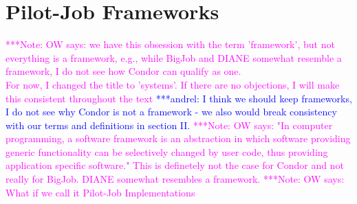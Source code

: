 \documentclass[conference,final]{IEEEtran}
\makeatletter
\def\reduwave{\bgroup \markoverwith{\lower3.5\p@\hbox{\sixly \textcolor{red}{\char58}}}\ULon}
\newcommand{\jwave}[1]{ {\reduwave{#1}}}
\newcommand{\jhanote}[1]{ {\textcolor{red} { ***shantenu: #1 }}}
\newcommand{\alnote}[1]{ {\textcolor{blue} { ***andrel: #1 }}}
\newcommand{\note}[1]{ {\textcolor{magenta} { ***Note: #1 }}}
\newcommand{\jwave}[1]{#1}
\newcommand{\alnote}[1]{}
\newcommand{\jhanote}[1]{}
\newcommand{\note}[1]{}
\newcommand{\cus}{CUs\xspace}
\newcommand{\upp}{\vspace*{-0.5em}}
\makeatother
\begin{document}


 



\section{Pilot-Job Frameworks\upp\upp}

\note{OW says: we have this obsession with the term 'framework', but 
not everything is a framework, e.g., while BigJob and DIANE somewhat
resemble a framework, I do not see how Condor can qualify as one.\\
For now, I changed the title to 'systems'. If there are no objections,
I will make this consistent throughout the text}\alnote{I think we should keep 
frameworks, I do not see why Condor is not a framework -  we also would break 
consistency with our terms and definitions in section II.}\note{OW says:
"In computer programming, a software framework is an abstraction in which software providing generic functionality can be selectively changed by user code, thus providing application specific software." This is 
definetely not the case for Condor and not really for BigJob. DIANE somewhat 
resembles a framework.}
\note{OW says: What if we call it Pilot-Job Implementations}
\end{document}
